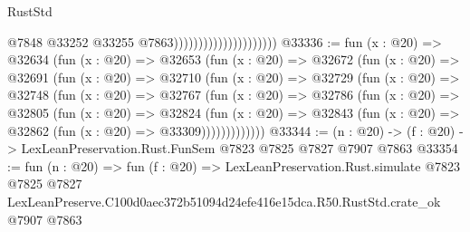 \begin{lexlean}{RustStd}
\begin{coremodule}
                                              @7848
                                              @33252
                                              @33255
                                              @7863)))))))))))))))))))))
@33336 := fun (x : @20) =>
  @32634
    (fun (x : @20) =>
    @32653
      (fun (x : @20) =>
      @32672
        (fun (x : @20) =>
        @32691
          (fun (x : @20) =>
          @32710
            (fun (x : @20) =>
            @32729
              (fun (x : @20) =>
              @32748
                (fun (x : @20) =>
                @32767
                  (fun (x : @20) =>
                  @32786
                    (fun (x : @20) =>
                    @32805
                      (fun (x : @20) =>
                      @32824
                        (fun (x : @20) =>
                        @32843 (fun (x : @20) => @32862 (fun (x : @20) => @33309)))))))))))))
@33344 := (n : @20) -> (f : @20) -> LexLeanPreservation.Rust.FunSem @7823 @7825 @7827 @7907 @7863
@33354 := fun (n : @20) =>
  fun (f : @20) =>
  LexLeanPreservation.Rust.simulate
    @7823
    @7825
    @7827
    LexLeanPreserve.C100d0aec372b51094d24efe416e15dca.R50.RustStd.crate_ok
    @7907
    @7863
\end{coremodule}
\end{lexlean}
